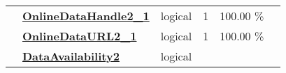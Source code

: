 \documentclass[]{article}
\begin{document}
\begin{longtable}[]{@{}lllrcl@{}}
\begin{minipage}[t]{0.07\columnwidth}
\strut
\end{minipage} & \begin{minipage}[t]{0.35\columnwidth}\raggedright\strut
\textbf{\protect\hyperlink{onlinedatahandle2_1}{OnlineDataHandle2\_1}}\strut
\end{minipage} & \begin{minipage}[t]{0.11\columnwidth}\raggedright\strut
logical\strut
\end{minipage} & \begin{minipage}[t]{0.10\columnwidth}\raggedleft\strut
1\strut
\end{minipage} & \begin{minipage}[t]{0.10\columnwidth}\centering\strut
100.00 \%\strut
\end{minipage} & \begin{minipage}[t]{0.12\columnwidth}\raggedright\strut
\strut
\end{minipage}\tabularnewline
\begin{minipage}[t]{0.07\columnwidth}\raggedright\strut
\strut
\end{minipage} & \begin{minipage}[t]{0.35\columnwidth}\raggedright\strut
\textbf{\protect\hyperlink{onlinedataurl2_1}{OnlineDataURL2\_1}}\strut
\end{minipage} & \begin{minipage}[t]{0.11\columnwidth}\raggedright\strut
logical\strut
\end{minipage} & \begin{minipage}[t]{0.10\columnwidth}\raggedleft\strut
1\strut
\end{minipage} & \begin{minipage}[t]{0.10\columnwidth}\centering\strut
100.00 \%\strut
\end{minipage} & \begin{minipage}[t]{0.12\columnwidth}\raggedright\strut
\strut
\end{minipage}\tabularnewline
\begin{minipage}[t]{0.07\columnwidth}\raggedright\strut
\strut
\end{minipage} & \begin{minipage}[t]{0.35\columnwidth}\raggedright\strut
\textbf{\protect\hyperlink{dataavailability2}{DataAvailability2}}\strut
\end{minipage} & \begin{minipage}[t]{0.11\columnwidth}\raggedright\strut
logical\strut
\end{minipage} & \begin{minipage}[t]{0.10\columnwidth}\raggedleft\strut

\end{minipage}
\end{longtable}
\end{document}
